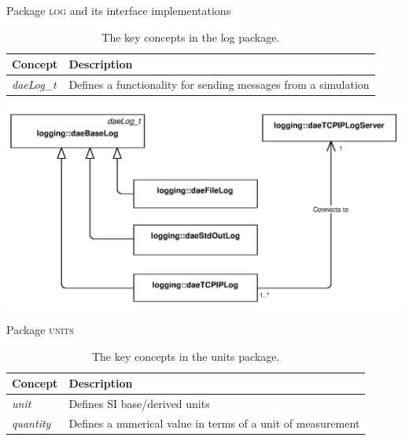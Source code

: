 \documentclass[compress,newPxFont,sthlmFooter]{beamer}
\begin{document}
\begin{frame}{Package \textsc{log} and its interface implementations}
\scriptsize
{
\begin{table}
  \caption*{The key concepts in the \alert{log} package.}
  \begin{tabularx}{\linewidth}{l>{\raggedright}X}
    \toprule
    \textcolor{sthlmRed}{\textbf{Concept}} & \textcolor{sthlmRed}{\textbf{Description}} \tabularnewline
    \midrule
    \textcolor{sthlmRed}{\textit{daeLog\_t}} & Defines a functionality for sending messages from a simulation \tabularnewline 
    \bottomrule
  \end{tabularx}
\end{table}
}
    \begin{center}
        \includegraphics[width=0.6\paperwidth]{Supplemental_Figure_S7.png}      
    \end{center}
\end{frame}

\begin{frame}{Package \textsc{units}}
\scriptsize
{
\begin{table}
  \caption*{The key concepts in the \alert{units} package.}
  \begin{tabularx}{\linewidth}{l>{\raggedright}X}
    \toprule
    \textcolor{sthlmRed}{\textbf{Concept}} & \textcolor{sthlmRed}{\textbf{Description}} \tabularnewline
    \midrule
    \textcolor{sthlmRed}{\textit{unit}} & Defines SI base/derived units \tabularnewline 
    \textcolor{sthlmRed}{\textit{quantity}} & Defines a numerical value in terms of a unit of measurement \tabularnewline
    \bottomrule
  \end{tabularx}
\end{table}
}
\end{frame}

% 
% 
\end{document}
